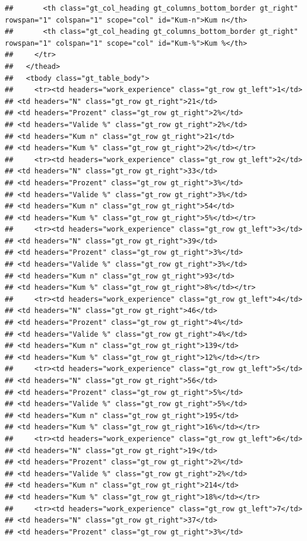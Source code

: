 \documentclass[
  a4paper,
  DIV=11,
  numbers=noendperiod]{scrartcl}
\begin{document}
\begin{verbatim}
##       <th class="gt_col_heading gt_columns_bottom_border gt_right" rowspan="1" colspan="1" scope="col" id="Kum-n">Kum n</th>
##       <th class="gt_col_heading gt_columns_bottom_border gt_right" rowspan="1" colspan="1" scope="col" id="Kum-%">Kum %</th>
##     </tr>
##   </thead>
##   <tbody class="gt_table_body">
##     <tr><td headers="work_experience" class="gt_row gt_left">1</td>
## <td headers="N" class="gt_row gt_right">21</td>
## <td headers="Prozent" class="gt_row gt_right">2%</td>
## <td headers="Valide %" class="gt_row gt_right">2%</td>
## <td headers="Kum n" class="gt_row gt_right">21</td>
## <td headers="Kum %" class="gt_row gt_right">2%</td></tr>
##     <tr><td headers="work_experience" class="gt_row gt_left">2</td>
## <td headers="N" class="gt_row gt_right">33</td>
## <td headers="Prozent" class="gt_row gt_right">3%</td>
## <td headers="Valide %" class="gt_row gt_right">3%</td>
## <td headers="Kum n" class="gt_row gt_right">54</td>
## <td headers="Kum %" class="gt_row gt_right">5%</td></tr>
##     <tr><td headers="work_experience" class="gt_row gt_left">3</td>
## <td headers="N" class="gt_row gt_right">39</td>
## <td headers="Prozent" class="gt_row gt_right">3%</td>
## <td headers="Valide %" class="gt_row gt_right">3%</td>
## <td headers="Kum n" class="gt_row gt_right">93</td>
## <td headers="Kum %" class="gt_row gt_right">8%</td></tr>
##     <tr><td headers="work_experience" class="gt_row gt_left">4</td>
## <td headers="N" class="gt_row gt_right">46</td>
## <td headers="Prozent" class="gt_row gt_right">4%</td>
## <td headers="Valide %" class="gt_row gt_right">4%</td>
## <td headers="Kum n" class="gt_row gt_right">139</td>
## <td headers="Kum %" class="gt_row gt_right">12%</td></tr>
##     <tr><td headers="work_experience" class="gt_row gt_left">5</td>
## <td headers="N" class="gt_row gt_right">56</td>
## <td headers="Prozent" class="gt_row gt_right">5%</td>
## <td headers="Valide %" class="gt_row gt_right">5%</td>
## <td headers="Kum n" class="gt_row gt_right">195</td>
## <td headers="Kum %" class="gt_row gt_right">16%</td></tr>
##     <tr><td headers="work_experience" class="gt_row gt_left">6</td>
## <td headers="N" class="gt_row gt_right">19</td>
## <td headers="Prozent" class="gt_row gt_right">2%</td>
## <td headers="Valide %" class="gt_row gt_right">2%</td>
## <td headers="Kum n" class="gt_row gt_right">214</td>
## <td headers="Kum %" class="gt_row gt_right">18%</td></tr>
##     <tr><td headers="work_experience" class="gt_row gt_left">7</td>
## <td headers="N" class="gt_row gt_right">37</td>
## <td headers="Prozent" class="gt_row gt_right">3%</td>

\end{verbatim}
\end{document}
